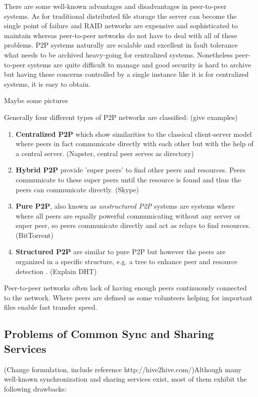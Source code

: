 There are some well-known advantages and disadvantages in peer-to-peer systems. As for traditional distributed file storage the server can become the single point of failure and RAID networks are expensive and sophisticated to maintain whereas peer-to-peer networks do not have to deal with all of these problems. P2P systems naturally are scalable and excellent in fault tolerance what needs to be archived heavy-going for centralized systems. Nonetheless peer-to-peer systems are quite difficult to manage and good security is hard to archive but having these concerns controlled by a single instance like it is for centralized systems, it is easy to obtain.

Maybe some pictures

Generally four different types of P2P networks are classified: (give examples)
\begin{enumerate}
	\item \textbf{Centralized P2P} which show similarities to the classical client-server model where peers in fact communicate directly with each other but with the help of a central server. (Napster, central peer serves as directory)
	\item \textbf{Hybrid P2P} provide 'super peers' to find other peers and resources. Peers communicate to these super peers until the resource is found and thus the peers can communicate directly. (Skype)
	\item \textbf{Pure P2P}, also known as \textit{unstructured P2P} systems are systems where where all peers are equally powerful communicating without any server or super peer, so peers communicate directly and act as relays to find resources. (BitTorrent)
	\item \textbf{Structured P2P} are similar to pure P2P but however the peers are organized in a specific structure, e.g. a tree to enhance peer and resource detection \cite{ptp-introduction:tomptp}. (Explain DHT)
\end{enumerate}

Peer-to-peer networks often lack of having enough peers continuously connected to the network. Where peers are defined as some volunteers helping for important files enable fast transfer speed.

\subsection{Problems of Common Sync and Sharing Services}
(Change formulation, include reference http://hive2hive.com/)Although many well-known synchronization and sharing services exist, most of them exhibit the following drawbacks:

